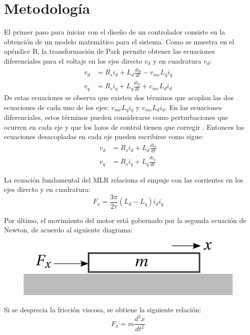 \section{Metodología}

El primer paso para iniciar con el diseño de un controlador consiste en la obtención de un modelo matemático para el sistema. Como se muestra en el apéndice B, la transformación de Park permite obtener las ecuaciones diferenciales para el voltaje en los ejes directo $v_d$ y en cuadratura $v_d$:
\begin{align*}
v_d &= R_s i_d + L_d\frac{di_d}{dt} - v_{me}L_q i_q\\
v_q &= R_s i_q + L_q\frac{di_q}{dt} + v_{me}L_d i_d
\end{align*}
De estas ecuaciones se observa que existen dos términos que acoplan las dos ecuaciones de cada uno de los ejes: $v_{me}L_q i_q$ y $v_{me}L_d i_d$. En las ecuaciones diferenciales, estos términos pueden considerarse como perturbaciones que ocurren en cada eje y que los lazos de control tienen que corregir \cite{jeanpaul2011}. Entonces las ecuaciones desacopladas en cada eje pueden escribirse como sigue:
\begin{align}
v_d &= R_s i_d + L_d\frac{di_d}{dt}
\label{daxiseq}\\
v_q &= R_s i_q + L_q\frac{di_q}{dt}
\label{qaxiseq}
\end{align}

La ecuación fundamental del MLR relaciona el empuje con las corrientes en los ejes directo y en cuadratura:
\begin{equation}
F_x = \frac{3\pi}{2\tau}(L_d - L_q)i_d i_q
\label{thrusteq}
\end{equation}

Por último, el movimiento del motor está gobernado por la segunda ecuación de Newton, de acuerdo al siguiente diagrama:
\begin{figure}[hbtp]
\centering
\includegraphics[scale=0.25]{../img/Diseno_de_un_controlador_de_velocidad/displacement.eps}
\end{figure}

Si se desprecia la fricción viscosa, se obtiene la siguiente relación:
\begin{equation}
F_x = m\frac{d^2x}{dt^2}
\label{displacementeq}
\end{equation}

